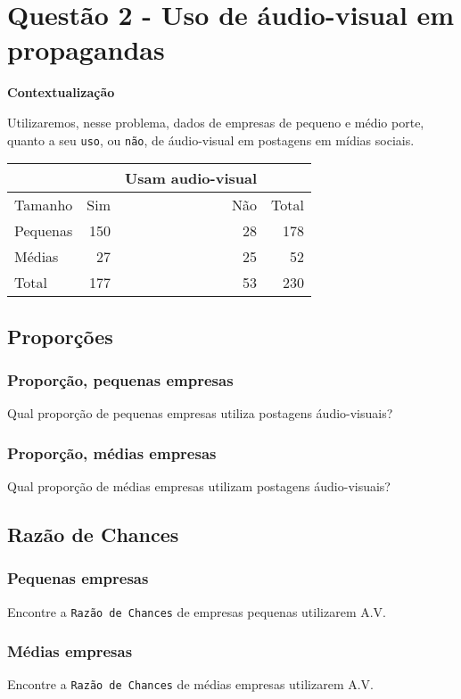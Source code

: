\documentclass[11pt]{article}
\begin{document}
\section{Questão 2 - Uso de áudio-visual em propagandas}
\label{sec:org1a0f98d}
\textbf{Contextualização}

Utilizaremos, nesse problema, dados de empresas de pequeno e médio
porte, quanto a seu \texttt{uso}, ou \texttt{não}, de áudio-visual em postagens em
mídias sociais.

\begin{center}
\begin{tabular}{lrrr}
\hline
 &  & Usam audio-visual & \\
\hline
Tamanho & Sim & Não & Total\\
\hline
Pequenas & 150 & 28 & 178\\
Médias & 27 & 25 & 52\\
Total & 177 & 53 & 230\\
\hline
\end{tabular}
\end{center}
\subsection{Proporções}
\label{sec:org2a73cbf}
\subsubsection{Proporção, pequenas empresas}
\label{sec:org6d399a9}
Qual proporção de pequenas empresas utiliza postagens áudio-visuais?
\subsubsection{Proporção, médias empresas}
\label{sec:orgeeab4cf}
Qual proporção de médias empresas utilizam postagens áudio-visuais?
\subsection{Razão de Chances}
\label{sec:org34c59ae}
\subsubsection{Pequenas empresas}
\label{sec:org20a43f8}
Encontre a \texttt{Razão de Chances} de empresas pequenas utilizarem A.V.
\subsubsection{Médias empresas}
\label{sec:org551babe}
Encontre a \texttt{Razão de Chances} de médias empresas utilizarem A.V.
\end{document}
